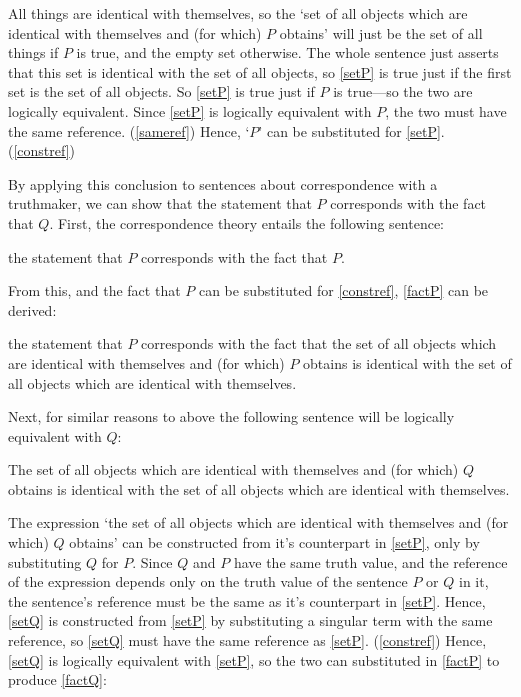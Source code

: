 All things are identical with themselves, so the `set of all objects which are identical with themselves and (for which) $P$ obtains' will just be the set of all things if $P$ is true, and the empty set otherwise.
The whole sentence just asserts that this set is identical with the set of all objects, so \ref{setP} is true just if the first set is the set of all objects.
So \ref{setP} is true just if $P$ is true---so the two are logically equivalent.
Since \ref{setP} is logically equivalent with $P$, the two must have the same reference.
(\ref{sameref})
Hence, `$P$' can be substituted for \ref{setP}. (\ref{constref})

By applying this conclusion to sentences about correspondence with a truthmaker, we can show that the statement that $P$ corresponds with the fact that $Q$.
First, the correspondence theory entails the following sentence:

	\begin{example} \label{stateP}
	the statement that $P$ corresponds with the fact that $P$.
	\end{example}

From this, and the fact that $P$ can be substituted for \ref{constref}, \ref{factP} can be derived:

	\begin{example} \label{factP}
	the statement that $P$ corresponds with the fact that the set of all objects which are identical with themselves and (for which) $P$ obtains is identical with the set of all objects which are identical with themselves.
	\end{example}

Next, for similar reasons to above the following sentence will be logically equivalent with $Q$:

	\begin{example} \label{setQ}
	The set of all objects which are identical with themselves and (for which) $Q$ obtains is identical with the set of all objects which are identical with themselves.
	\end{example}

The expression `the set of all objects which are identical with themselves and (for which) $Q$ obtains' can be constructed from it's counterpart in \ref{setP}, only by substituting $Q$ for $P$.
Since $Q$ and $P$ have the same truth value, and the reference of the expression depends only on the truth value of the sentence $P$ or $Q$ in it, the sentence's reference must be the same as it's counterpart in \ref{setP}.
Hence, \ref{setQ} is constructed from \ref{setP} by substituting a singular term with the same reference, so \ref{setQ} must have the same reference as \ref{setP}.
(\ref{constref})
Hence, \ref{setQ} is logically equivalent with \ref{setP}, so the two can substituted in \ref{factP} to produce \ref{factQ}:


